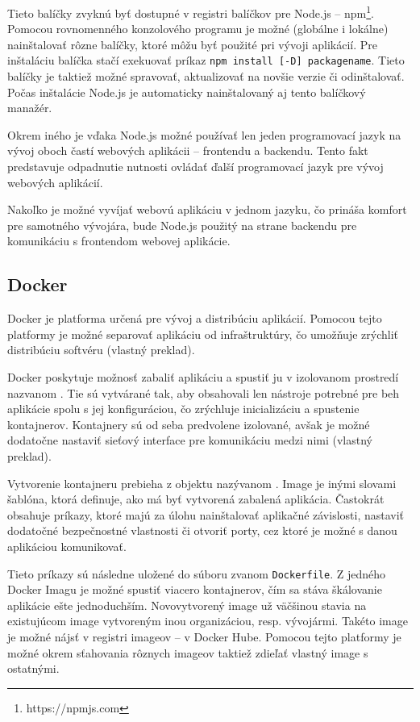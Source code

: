 Tieto balíčky zvyknú byť dostupné v registri balíčkov pre Node.js -- npm\footnote{https://npmjs.com}. Pomocou rovnomenného konzolového programu je možné (globálne i lokálne) nainštalovať rôzne balíčky, ktoré môžu byť použité pri vývoji aplikácií. Pre inštaláciu balíčka stačí exekuovať príkaz \texttt{npm install [-D] packagename}. Tieto balíčky je taktiež možné spravovať, aktualizovať na novšie verzie či odinštalovať. Počas inštalácie Node.js je automaticky nainštalovaný aj tento balíčkový manažér.

Okrem iného je vďaka Node.js možné používať len jeden programovací jazyk na vývoj oboch častí webových aplikácii -- frontendu a backendu. Tento fakt predstavuje odpadnutie nutnosti ovládať ďalší programovací jazyk pre vývoj webových aplikácií.

Nakoľko je možné vyvíjať webovú aplikáciu v jednom jazyku, čo prináša komfort pre samotného vývojára, bude Node.js použitý na strane backendu pre komunikáciu s frontendom webovej aplikácie.

\subsection {Docker}
Docker je platforma určená pre vývoj a distribúciu aplikácií. Pomocou tejto platformy je možné separovať aplikáciu od infraštruktúry, čo umožňuje zrýchliť distribúciu softvéru \cite{about_docker} (vlastný preklad).

Docker poskytuje možnosť zabaliť aplikáciu a spustiť ju v izolovanom prostredí nazvanom . Tie sú vytvárané tak, aby obsahovali len nástroje potrebné pre beh aplikácie spolu s jej konfiguráciou, čo zrýchluje inicializáciu a spustenie kontajnerov. Kontajnery sú od seba predvolene izolované, avšak je možné dodatočne nastaviť sieťový interface pre komunikáciu medzi nimi \cite{about_docker} (vlastný preklad).

Vytvorenie kontajneru prebieha z objektu nazývanom . Image je inými slovami šablóna, ktorá definuje, ako má byť vytvorená zabalená aplikácia. Častokrát obsahuje príkazy, ktoré majú za úlohu nainštalovať aplikačné závislosti, nastaviť dodatočné bezpečnostné vlastnosti či otvoriť porty, cez ktoré je možné s danou aplikáciou komunikovať.

Tieto príkazy sú následne uložené do súboru zvanom \texttt{Dockerfile}. Z jedného Docker Imagu je možné spustiť viacero kontajnerov, čím sa stáva škálovanie aplikácie ešte jednoduchším. Novovytvorený image už väčšinou stavia na existujúcom image vytvoreným inou organizáciou, resp. vývojármi. Takéto image je možné nájsť v registri imageov -- v Docker Hube. Pomocou tejto platformy je možné okrem sťahovania rôznych imageov taktiež zdieľať vlastný image s ostatnými.

